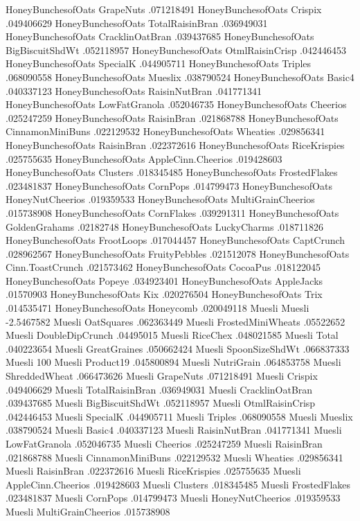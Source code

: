 HoneyBunchesofOats	GrapeNuts	.071218491
HoneyBunchesofOats	Crispix	.049406629
HoneyBunchesofOats	TotalRaisinBran	.036949031
HoneyBunchesofOats	CracklinOatBran	.039437685
HoneyBunchesofOats	BigBiscuitShdWt	.052118957
HoneyBunchesofOats	OtmlRaisinCrisp	.042446453
HoneyBunchesofOats	SpecialK	.044905711
HoneyBunchesofOats	Triples	.068090558
HoneyBunchesofOats	Mueslix	.038790524
HoneyBunchesofOats	Basic4	.040337123
HoneyBunchesofOats	RaisinNutBran	.041771341
HoneyBunchesofOats	LowFatGranola	.052046735
HoneyBunchesofOats	Cheerios	.025247259
HoneyBunchesofOats	RaisinBran	.021868788
HoneyBunchesofOats	CinnamonMiniBuns	.022129532
HoneyBunchesofOats	Wheaties	.029856341
HoneyBunchesofOats	RaisinBran	.022372616
HoneyBunchesofOats	RiceKrispies	.025755635
HoneyBunchesofOats	AppleCinn.Cheerios	.019428603
HoneyBunchesofOats	Clusters	.018345485
HoneyBunchesofOats	FrostedFlakes	.023481837
HoneyBunchesofOats	CornPops	.014799473
HoneyBunchesofOats	HoneyNutCheerios	.019359533
HoneyBunchesofOats	MultiGrainCheerios	.015738908
HoneyBunchesofOats	CornFlakes	.039291311
HoneyBunchesofOats	GoldenGrahams	.02182748
HoneyBunchesofOats	LuckyCharms	.018711826
HoneyBunchesofOats	FrootLoops	.017044457
HoneyBunchesofOats	CaptCrunch	.028962567
HoneyBunchesofOats	FruityPebbles	.021512078
HoneyBunchesofOats	Cinn.ToastCrunch	.021573462
HoneyBunchesofOats	CocoaPus	.018122045
HoneyBunchesofOats	Popeye	.034923401
HoneyBunchesofOats	AppleJacks	.01570903
HoneyBunchesofOats	Kix	.020276504
HoneyBunchesofOats	Trix	.014535471
HoneyBunchesofOats	Honeycomb	.020049118
Muesli	Muesli	-2.5467582
Muesli	OatSquares	.062363449
Muesli	FrostedMiniWheats	.05522652
Muesli	DoubleDipCrunch	.04495015
Muesli	RiceChex	.048021585
Muesli	Total	.040223654
Muesli	GreatGraines	.050662424
Muesli	SpoonSizeShdWt	.066837333
Muesli	100%
Muesli	Product19	.045800894
Muesli	NutriGrain	.064853758
Muesli	ShreddedWheat	.066473626
Muesli	GrapeNuts	.071218491
Muesli	Crispix	.049406629
Muesli	TotalRaisinBran	.036949031
Muesli	CracklinOatBran	.039437685
Muesli	BigBiscuitShdWt	.052118957
Muesli	OtmlRaisinCrisp	.042446453
Muesli	SpecialK	.044905711
Muesli	Triples	.068090558
Muesli	Mueslix	.038790524
Muesli	Basic4	.040337123
Muesli	RaisinNutBran	.041771341
Muesli	LowFatGranola	.052046735
Muesli	Cheerios	.025247259
Muesli	RaisinBran	.021868788
Muesli	CinnamonMiniBuns	.022129532
Muesli	Wheaties	.029856341
Muesli	RaisinBran	.022372616
Muesli	RiceKrispies	.025755635
Muesli	AppleCinn.Cheerios	.019428603
Muesli	Clusters	.018345485
Muesli	FrostedFlakes	.023481837
Muesli	CornPops	.014799473
Muesli	HoneyNutCheerios	.019359533
Muesli	MultiGrainCheerios	.015738908
